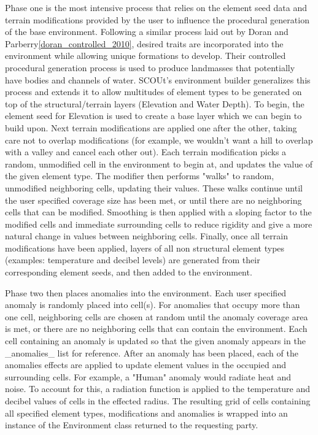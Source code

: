 \documentclass[]{report}
\begin{document}
Phase one is the most intensive process that relies on the element seed data and terrain modifications provided by the user to influence the procedural generation of the base environment.
Following a similar process laid out by Doran and Parberry\ref{doran_controlled_2010}, desired traits are incorporated into the environment while allowing unique formations to develop.
Their controlled procedural generation process is used to produce landmasses that potentially have bodies and channels of water.
SCOUt's environment builder generalizes this process and extends it to allow multitudes of element types to be generated on top of the structural/terrain layers (Elevation and Water Depth).
To begin, the element seed for Elevation is used to create a base layer which we can begin to build upon.
Next terrain modifications are applied one after the other, taking care not to overlap modifications (for example, we wouldn't want a hill to overlap with a valley and cancel each other out).
Each terrain modification picks a random, unmodified cell in the environment to begin at, and updates the value of the given element type.
The modifier then performs "walks" to random, unmodified neighboring cells, updating their values.
These walks continue until the user specified coverage size has been met, or until there are no neighboring cells that can be modified.
Smoothing is then applied with a sloping factor to the modified cells and immediate surrounding cells to reduce rigidity and give a more natural change in values between neighboring cells.
Finally, once all terrain modifications have been applied, layers of all non structural element types (examples: temperature and decibel levels) are generated from their corresponding element seeds, and then added to the environment.

Phase two then places anomalies into the environment.
Each user specified anomaly is randomly placed into cell(s).
For anomalies that occupy more than one cell, neighboring cells are chosen at random until the anomaly coverage area is met, or there are no neighboring cells that can contain the environment.
Each cell containing an anomaly is updated so that the given anomaly appears in the _anomalies_ list for reference.
After an anomaly has been placed, each of the anomalies effects are applied to update element values in the occupied and surrounding cells.
For example, a "Human" anomaly would radiate heat and noise.
To account for this, a radiation function  is applied to the temperature and decibel values of cells in the effected radius.
The resulting grid of cells containing all specified element types, modifications and anomalies is wrapped into an instance of the Environment class returned to the requesting party.
\end{document}
